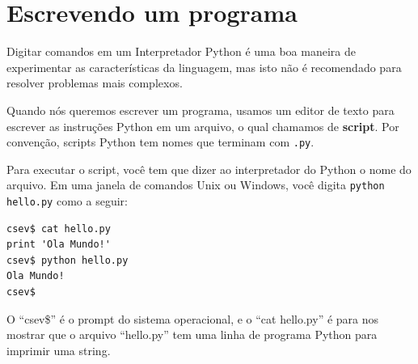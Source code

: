 \section{Escrevendo um programa}
%

Digitar comandos em um Interpretador Python é uma boa maneira de experimentar
as características da linguagem, mas isto não é recomendado para resolver
problemas mais complexos.
%

Quando nós queremos escrever um programa,
usamos um editor de texto para escrever as instruções Python em um arquivo,
o qual chamamos de {\bf script}. Por convenção,
scripts Python tem nomes que terminam com {\tt .py}.
%

%

Para executar o script, você tem que dizer ao interpretador do Python
o nome do arquivo. Em uma janela de comandos Unix ou Windows, você digita
{\tt python hello.py} como a seguir:
%

\beforeverb
\begin{verbatim}
csev$ cat hello.py
print 'Ola Mundo!'
csev$ python hello.py
Ola Mundo!
csev$
\end{verbatim}
\afterverb


O ``csev\$'' é o prompt do sistema operacional, e o ``cat hello.py'' é
para nos mostrar que o arquivo ``hello.py'' tem uma linha de programa Python para
imprimir uma string.
%

